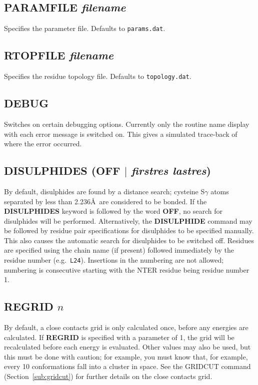 \documentclass[12pt]{article}
\begin{document}
\subsection{PARAMFILE {\em filename}}
Specifies the parameter file. Defaults to {\tt params.dat}.

\subsection{RTOPFILE {\em filename}}
Specifies the residue topology file. Defaults to {\tt topology.dat}.

\subsection{DEBUG}
Switches on certain debugging options. Currently only the routine
name display with each error message is switched on. This gives a
simulated trace-back of where the error occurred.

\subsection{DISULPHIDES (OFF $\mid$ {\em firstres lastres})}
By default, disulphides are found by a distance search; cysteine
S$\gamma$ atoms separated by less than 2.236\AA\ are considered to be
bonded. If the {\bf DISULPHIDES} keyword is followed by the word {\bf
OFF}, no search for disulphides will be performed. Alternatively, the
{\bf DISULPHIDE} command may be followed by residue pair
specifications for disulphides to be specified manually. This also
causes the automatic search for disulphides to be switched off.
Residues are specified using the chain name (if present) followed
immediately by the residue number (e.g.\ {\tt L24}). Insertions in the
numbering are not allowed; numbering is consecutive starting with the
NTER residue being residue number 1.


\subsection{REGRID $n$}
\label{sub:regrid}
By default, a close contacts grid is only calculated once, before any
energies are calculated. If {\bf REGRID} is specified with a parameter
of 1, the grid will be recalculated before each energy is evaluated.
Other values may also be used, but this must be done with caution; for
example, you must know that, for example, every 10 conformations fall
into a cluster in space. See the GRIDCUT command
(Section~\ref{sub:gridcut}) for further details on the close contacts
grid.
\end{document}
